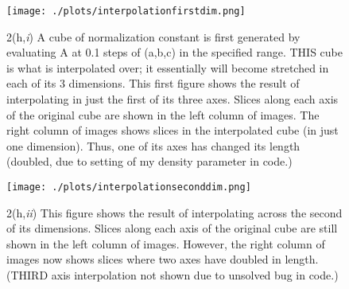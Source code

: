 \begin{figure}[!htb]
  \centering
  \texttt{[image: ./plots/interpolationfirstdim.png]}
  \caption{2(h,\textit{i}) A cube of normalization constant is first generated by evaluating A at 0.1 steps of (a,b,c) in the specified range. THIS cube is what is interpolated over; it essentially will become stretched in each of its 3 dimensions. This first figure shows the result of interpolating in just the first of its three axes. Slices along each axis of the original cube are shown in the left column of images. The right column of images shows slices in the interpolated cube (in just one dimension). Thus, one of its axes has changed its length (doubled, due to setting of my density parameter in code.)}
  \label{fig:onedim}
\end{figure}

\begin{figure}[!htb]
  \centering
  \texttt{[image: ./plots/interpolationseconddim.png]}
  \caption{2(h,\textit{ii}) This figure shows the result of interpolating across the second of its dimensions. Slices along each axis of the original cube are still shown in the left column of images. However, the right column of images now shows slices where two axes have doubled in length. (THIRD axis interpolation not shown due to unsolved bug in code.)}
  \label{fig:twodim}
\end{figure}

